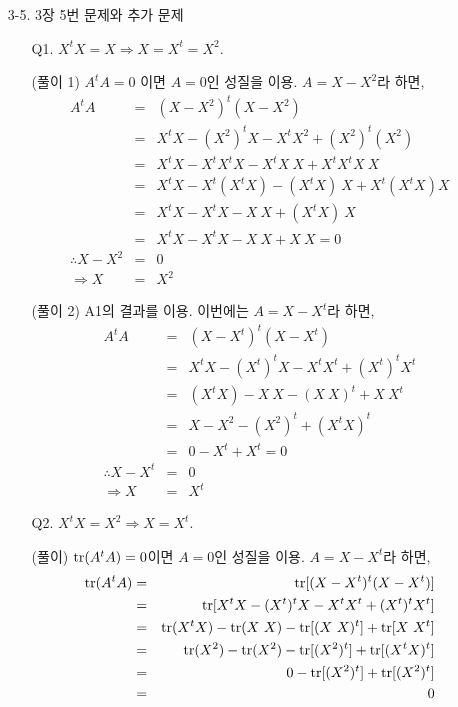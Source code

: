 \documentclass[fleqn, a4paper]{article}\usepackage[]{graphicx}\usepackage[]{color}
\begin{document}
\begin{enumerate}
\item[3-5.] 3장 5번 문제와 추가 문제 
\begin{enumerate}
\item[Q1.] $X^tX = X\Rightarrow X = X^t = X^2$.
\item[(풀이 1)] $A^tA = 0$ 이면 $A = 0$인 성질을 이용. $A=X-X^2$라 하면,
\begin{eqnarray*}
A^tA&=&(X-X^2)^t(X-X^2)\\
      &=&X^tX-(X^2)^tX - X^tX^2 + (X^2)^t(X^2)\\
      &=&X^tX-X^tX^tX-X^tX\ X + X^tX^tX\ X\\
      &=&X^tX-X^t(X^tX)-(X^tX)\ X + X^t(X^tX)X\\
      &=&X^tX-X^tX-X\ X + (X^tX)\ X\\
      &=&X^tX-X^tX-X\ X + X\ X = 0\\
      \therefore X-X^2&=&0\\
      \Rightarrow X&=&X^2 
\end{eqnarray*}
\item[(풀이 2)] A1의 결과를 이용. 이번에는 $A=X-X^t$라 하면,
\begin{eqnarray*}
A^tA &=&(X-X^t)^t(X-X^t)\\ 
      &=&X^tX-(X^t)^tX - X^tX^t + (X^t)^tX^t\\
      &=&(X^tX)-X\ X - (X\ X)^t + X\ X^t\\
      &=&X-X^2-(X^2)^t + (X^tX)^t\\
      &=&0-X^t + X^t = 0\\
      \therefore X-X^t&=&0\\
      \Rightarrow X&=&X^t 
\end{eqnarray*}
\item[Q2.] $X^tX = X^2\Rightarrow X = X^t$.
\item[(풀이)] ${\rm tr}(A^tA)=0$이면 $A=0$인 성질을 이용. $A=X-X^t$라 하면,
\begin{eqnarray*}
{\rm tr}(A^tA)&=&{\rm tr}[(X-X^t)^t(X-X^t)]\\ 
      &=&{\rm tr}[X^tX-(X^t)^tX - X^tX^t + (X^t)^tX^t]\\
      &=&{\rm tr}(X^tX)-{\rm tr}(X\ X) - {\rm tr}[(X\ X)^t] + {\rm tr}[X\ X^t]\\
      &=&{\rm tr}(X^2)-{\rm tr}(X^2)-{\rm tr}[(X^2)^t] + {\rm tr}[(X^tX)^t]\\
      &=&0-{\rm tr}[(X^2)^t] + {\rm tr}[(X^2)^t]\\
      &=&0\\

\end{eqnarray*}
\end{enumerate}
\end{enumerate}
\end{document}
